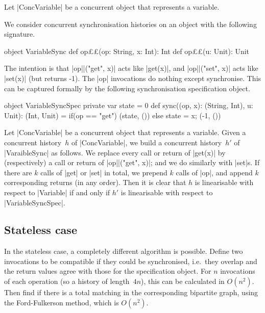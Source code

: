 Let |ConcVariable| be a concurrent object that represents a variable.  

We consider concurrent synchronisation histories on an object with the
following signature.   
\begin{scala}
object VariableSync{
  def op££(op: String, x: Int): Int
  def op££(u: Unit): Unit
} 
\end{scala}
%
The intention is that |op||("get", x)| acts like |get(x)|, and
|op||("set", x)| acts like |set(x)| (but returns -1).  The |op|
invocations do nothing except synchronise.  This can be captured formally by
the following synchronisation specification object.

\begin{scala}
object VariableSyncSpec{
  private var state = 0
  def sync((op, x): (String, Int), u: Unit): (Int, Unit) = 
    if(op == "get") (state, ()) else{ state = x; (-1, ()) }
}
\end{scala}


Let |ConcVariable| be a concurrent object that represents a variable.  Given a
concurrent history~$h$ of |ConcVariable|, we build a concurrent history~$h'$
of |VaraibleSync| as follows.  We replace every call or return of |get(x)| by
(respectively) a call or return of |op||("get", x)|; and we do similarly
with |set|s.  If there are $k$ calls of |get| or |set| in total, we prepend
$k$ calls of |op|, and append $k$ corresponding returns (in any order).
Then it is clear that $h$ is linearisable with respect to |Variable| if and
only if $h'$ is linearisable with respect to |VariableSyncSpec|.


\subsection{Stateless case}

In the stateless case, a completely different algorithm is possible.  Define
two invocations to be compatible if they could be synchronised, i.e.~they
overlap and the return values agree with those for the specification object.
For $n$ invocations of each operation (so a history of length~$4n$), this can
be calculated in $O(n^2)$.  Then find if there is a total matching in the
corresponding bipartite graph, using the Ford-Fulkerson method, which is
$O(n^2)$.
